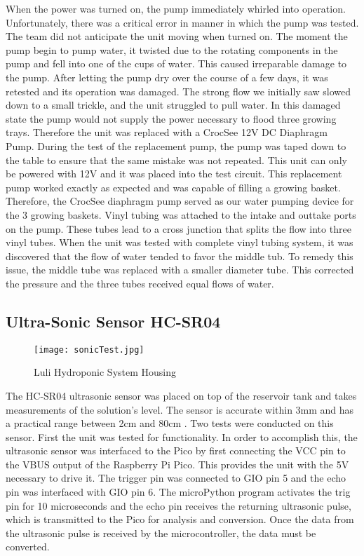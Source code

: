 \documentclass[12pt]{article} %
\begin{document}
\pagebreak

When the power was turned on, the pump immediately whirled into operation. Unfortunately, there was a critical error in manner in which the pump was tested. The team did not anticipate the unit moving when turned on. The moment the pump begin to pump water, it twisted due to the rotating components in the pump and fell into one of the cups of water. This caused irreparable damage to the pump. After letting the pump dry over the course of a few days, it was retested and its operation was damaged. The strong flow we initially saw slowed down to a small trickle, and the unit struggled to pull water. In this damaged state the pump would not supply the power necessary to flood three growing trays. Therefore the unit was replaced with a CrocSee 12V DC Diaphragm Pump. During the test of the replacement pump, the pump was taped down to the table to ensure that the same mistake was not repeated. This unit can only be powered with 12V \cite{ref_crocsee} and it was placed into the test circuit. This replacement pump worked exactly as expected and was capable of filling a growing basket. Therefore, the CrocSee diaphragm pump served as our water pumping device for the 3 growing baskets. Vinyl tubing was attached to the intake and outtake ports on the pump. These tubes lead to a cross junction that splits the flow into three vinyl tubes. When the unit was tested with complete vinyl tubing system, it was discovered that the flow of water tended to favor the middle tub. To remedy this issue, the middle tube was replaced with a smaller diameter tube. This corrected the pressure and the three tubes received equal flows of water.   

\subsection{Ultra-Sonic Sensor HC-SR04}

\begin{figure}[H]
  \centering
  \texttt{[image: sonicTest.jpg]}
  \caption{Luli Hydroponic System Housing}
  \label{fig:HCSR04 Test Circuit}
\end{figure}

\pagebreak

The HC-SR04 ultrasonic sensor was placed on top of the reservoir tank and takes measurements of the solution’s level. The sensor is accurate within 3mm and has a practical range between 2cm and 80cm \cite{ref_hcsr04}. Two tests were conducted on this sensor. First the unit was tested for functionality. In order to accomplish this, the ultrasonic sensor was interfaced to the Pico by first connecting the VCC pin to the VBUS output of the Raspberry Pi Pico. This provides the unit with the 5V necessary to drive it. The trigger pin was connected to GIO pin 5 and the echo pin was interfaced with GIO pin 6. The microPython program activates the trig pin for 10 microseconds and the echo pin receives the returning ultrasonic pulse, which is transmitted to the Pico for analysis and conversion. Once the data from the ultrasonic pulse is received by the microcontroller, the data must be converted.
\end{document}
